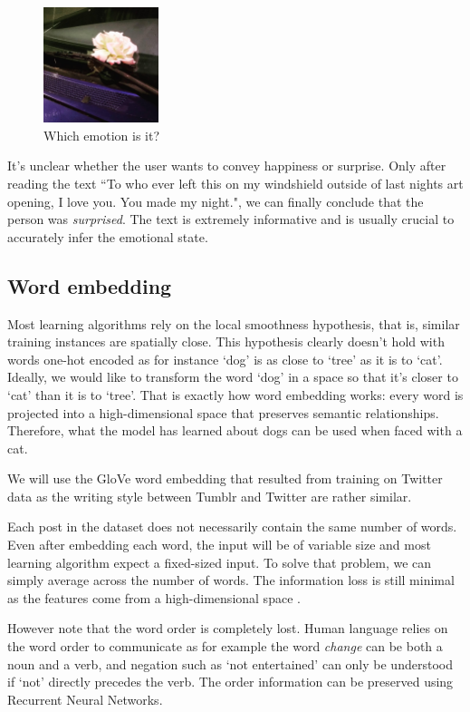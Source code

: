 \documentclass{article} %
\begin{document}
\begin{figure}[H]
    \centering
    \includegraphics[width=0.3\textwidth]{Images/flower.jpg}
    \caption{Which emotion is it?}
    \label{surprised-unclear}
\end{figure}

It's unclear whether the user wants to convey happiness or surprise. Only after reading the text ``To who ever left this on my windshield outside of last nights art opening, I love you. You made my night.", we can finally conclude that the person was {\em surprised}. The text is extremely informative and is usually crucial to accurately infer the emotional state.

\subsection{Word embedding}
Most learning algorithms rely on the local smoothness hypothesis, that is, similar training instances are spatially close. This hypothesis clearly doesn't hold with words one-hot encoded as for instance `dog' is as close to `tree' as it is to `cat'. Ideally, we would like to transform the word `dog' in a space so that it's closer to `cat' than it is to `tree'. That is exactly how word embedding works: every word is projected into a high-dimensional space that preserves semantic relationships. Therefore, what the model has learned about dogs can be used when faced with a cat.

We will use the GloVe word embedding that resulted from training on Twitter data as the writing style between Tumblr and Twitter are rather similar.

Each post in the dataset does not necessarily contain the same number of words. Even after embedding each word, the input will be of variable size and most learning algorithm expect a fixed-sized input. To solve that problem, we can simply average across the number of words. The information loss is still minimal as the features come from a high-dimensional space \citep{Flaxman-15}.

However note that the word order is completely lost. Human language relies on the word order to communicate as for example the word {\em change} can be both a noun and a verb, and negation such as `not entertained' can only be understood if `not' directly precedes the verb. The order information can be preserved using Recurrent Neural Networks.
\end{document}
